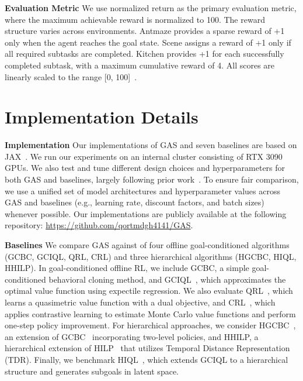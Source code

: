 \documentclass{article}
\begin{document}
\vspace{0.5em}

\textbf{Evaluation Metric}
We use normalized return as the primary evaluation metric, where the maximum achievable reward is normalized to 100. The reward structure varies across environments. Antmaze provides a sparse reward of +1 only when the agent reaches the goal state. Scene assigns a reward of +1 only if all required subtasks are completed. Kitchen provides +1 for each successfully completed subtask, with a maximum cumulative reward of 4. All scores are linearly scaled to the range [0, 100]~\cite{fu2020d4rl, park2025ogbench}.


\section{Implementation Details}
\label{app:implementation_details}

\vspace{0.5em}

\textbf{Implementation}
Our implementations of GAS and seven baselines are based on JAX~\cite{bradbury2018jax}. We run our experiments on an internal cluster consisting of RTX 3090 GPUs. We also test and tune different design choices and hyperparameters for both GAS and baselines, largely following prior work~\cite{park2023hiql, park2024foundation, park2025ogbench}. To ensure fair comparison, we use a unified set of model architectures and hyperparameter values across GAS and baselines (e.g., learning rate, discount factors, and batch sizes) whenever possible. Our implementations are publicly available at the following repository: \url{https://github.com/qortmdgh4141/GAS}.

\vspace{0.5em}

\textbf{Baselines} We compare GAS against of four offline goal-conditioned algorithms (GCBC, GCIQL, QRL, CRL) and three hierarchical algorithms (HGCBC, HIQL, HHILP). In goal-conditioned offline RL, we include GCBC, a simple goal-conditioned behavioral cloning method, and GCIQL~\cite{kostrikov2022offline, park2023hiql}, which approximates the optimal value function using expectile regression. We also evaluate QRL~\cite{wang2023optimal}, which learns a quasimetric value function with a dual objective, and CRL~\cite{eysenbach2022contrastive}, which applies contrastive learning to estimate Monte Carlo value functions and perform one-step policy improvement. For hierarchical approaches, we consider HGCBC~\cite{ghosh2021learning, park2023hiql}, an extension of GCBC~\cite{gupta2020relay, ghosh2021learning} incorporating two-level policies, and HHILP, a hierarchical extension of HILP~\cite{park2023hiql, park2024foundation} that utilizes Temporal Distance Representation (TDR). Finally, we benchmark HIQL~\cite{park2023hiql}, which extends GCIQL to a hierarchical structure and generates subgoals in latent space.
\end{document}
